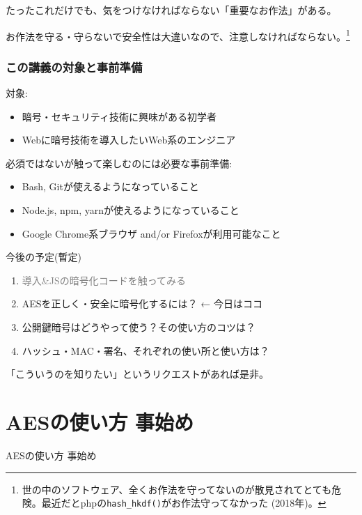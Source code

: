 \documentclass[12pt,dvipdfmx]{beamer}
\begin{document}
\begin{frame}

たったこれだけでも、気をつけなければならない\alert{「重要なお作法」}がある。

\vspace{2ex}

\alert{お作法を守る・守らないで安全性は大違い}なので、注意しなければならない。\footnote[frame]{世の中のソフトウェア、全くお作法を守ってないのが散見されてとても危険。最近だとphpの\texttt{hash\_hkdf()}がお作法守ってなかった (2018年)。}
\end{frame}

\begin{frame}
\frametitle{この講義の対象と事前準備}
対象:
\begin{itemize}
\item 暗号・セキュリティ技術に興味がある初学者
\item Webに暗号技術を導入したいWeb系のエンジニア
\end{itemize}

\vspace{2ex}

必須ではないが触って楽しむのには必要な事前準備:
\begin{itemize}
\item Bash, Gitが使えるようになっていること
\item Node.js, npm, yarnが使えるようになっていること
\item Google Chrome系ブラウザ and/or Firefoxが利用可能なこと
\end{itemize}
\end{frame}


\begin{frame}
今後の予定(暫定)
\begin{enumerate}
 \item \textcolor{gray}{導入\&JSの暗号化コードを触ってみる}
 \item \alert{AESを正しく・安全に暗号化するには？} ← 今日はココ
 \item 公開鍵暗号はどうやって使う？その使い方のコツは？
 \item ハッシュ・MAC・署名、それぞれの使い所と使い方は？
\end{enumerate}
「こういうのを知りたい」というリクエストがあれば是非。
\end{frame}

%

\section{AESの使い方 事始め}
\begin{frame}
\centering
{\Large AESの使い方 事始め}
\end{frame}
\end{document}
